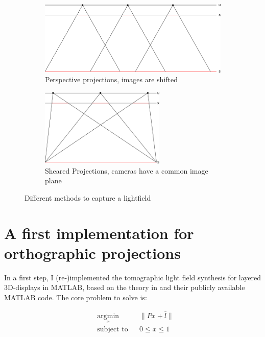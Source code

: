 \documentclass[11pt,a4paper,titlepage]{article}
\begin{document}
\begin{figure}
	\centering
	\begin{subfigure}[b]{0.4\textwidth}
 		\includegraphics[width=\textwidth]{sketches/perspective_shifted_projections.png}
  		\caption{Perspective projections, images are shifted}
   		\label{fig:perspective_shifted_projections}
	\end{subfigure}%
	\qquad
	\begin{subfigure}[b]{0.4\textwidth}
		\includegraphics[width=0.65\textwidth]{sketches/sheared_projections.png}
		\caption{Sheared Projections, cameras have a common image plane}
		\label{fig:sheared_projections}
	\end{subfigure}
	\caption{Different methods to capture a lightfield}\label{fig:animals}
\end{figure}

\section{A first implementation for orthographic projections}	\label{sec:first_implementation}
In a first step, I (re-)implemented the tomographic light field synthesis for layered 3D-displays in MATLAB, based on the theory in \cite{WETZ_TOMO} and their publicly available MATLAB code. The core problem to solve is:

\begin{equation} \label{eq:core_problem}
	\begin{aligned}
		& \underset{x}{\text{argmin}} & & \| Px + \bar{l} \| \\
		& \text{subject to} & & 0 \leq x \leq 1
	\end{aligned}
\end{equation}
\end{document}
